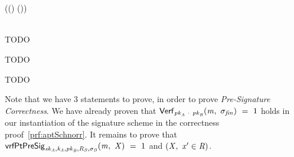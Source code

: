 \begin{definition}[$\cnstaEUFCMA$]
{{{            }\\[2\baselineskip]
            \procedure[linenumbering, syntaxhighlight=auto]{$\procSignOracle{\varMsg}{\varPubKeyAdv}{\varRandAdv}$} {
                \varSet \opAssign \varSet \opUnion {\varMsg} \\
                (\varKeyPair \opSeperate (\varNonce \opSeperate \varRand) \opSeperate (\varWit \opSeperate \varStatement)) \opFunResult \procSetupApt{\varSecParam} \\
                \pcreturn \procGenPtAptSig{\varMsg}{\varSecKey}{\varNonce}{\varPubKeyAdv}{\varRandAdv}{\varWit}
            }\\[2\baselineskip]

        }
    }
\end{definition}

\begin{definition}
    TODO~\cite{aumayr2020bitcoinchannels}
\end{definition}

\begin{definition}
    TODO~\cite{aumayr2020bitcoinchannels}
\end{definition}

\begin{definition}
    TODO~\cite{aumayr2020bitcoinchannels}
\end{definition}

Note that we have 3 statements to prove, in order to prove \textit{Pre-Signature Correctness}.
We have already proven that $\mathsf{Verf}_{\mathit{pk}_{\mathit{A}} ~\cdot~ \mathit{pk}_{\mathit{B}}}(\mathit{m} ,~ \sigma_{\mathit{fin}}) ~=~ 1$ holds in our instantiation of the signature scheme in the
correctness proof~\ref{prf:aptSchnorr}.
It remains to prove that $\mathsf{vrfPtPreSig}_{\mathit{sk}_{\mathit{A}},\mathit{\mathit{k}_{\mathit{A}}},\mathit{pk}_{\mathit{B}},\mathit{R}_{\mathit{B}},\sigma_{\mathit{B}}}(\mathit{m} ,~ \mathit{X}) ~=~ 1$ and
$(\mathit{X} ,~ \mathit{x}' \in \mathit{R})$.

